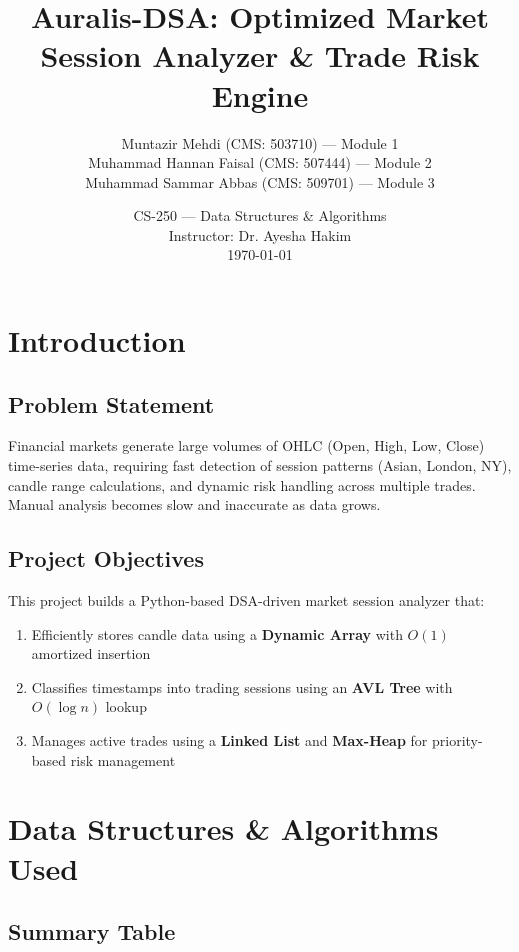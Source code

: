 \documentclass[12pt, a4paper]{article}
\title{\textbf{Auralis-DSA: Optimized Market Session Analyzer \& Trade Risk Engine}}
\author{
    Muntazir Mehdi (CMS: 503710) — Module 1 \\
    Muhammad Hannan Faisal (CMS: 507444) — Module 2 \\
    Muhammad Sammar Abbas (CMS: 509701) — Module 3
}
\date{
    CS-250 — Data Structures \& Algorithms \\
    Instructor: Dr. Ayesha Hakim \\
    \today
}
\begin{document}
\maketitle
\tableofcontents
\newpage

\section{Introduction}

\subsection{Problem Statement}
Financial markets generate large volumes of OHLC (Open, High, Low, Close) time-series data, requiring fast detection of session patterns (Asian, London, NY), candle range calculations, and dynamic risk handling across multiple trades. Manual analysis becomes slow and inaccurate as data grows.

\subsection{Project Objectives}
This project builds a Python-based DSA-driven market session analyzer that:
\begin{enumerate}
    \item Efficiently stores candle data using a \textbf{Dynamic Array} with $O(1)$ amortized insertion
    \item Classifies timestamps into trading sessions using an \textbf{AVL Tree} with $O(\log n)$ lookup
    \item Manages active trades using a \textbf{Linked List} and \textbf{Max-Heap} for priority-based risk management
\end{enumerate}

\section{Data Structures \& Algorithms Used}

\subsection{Summary Table}
\end{document}
